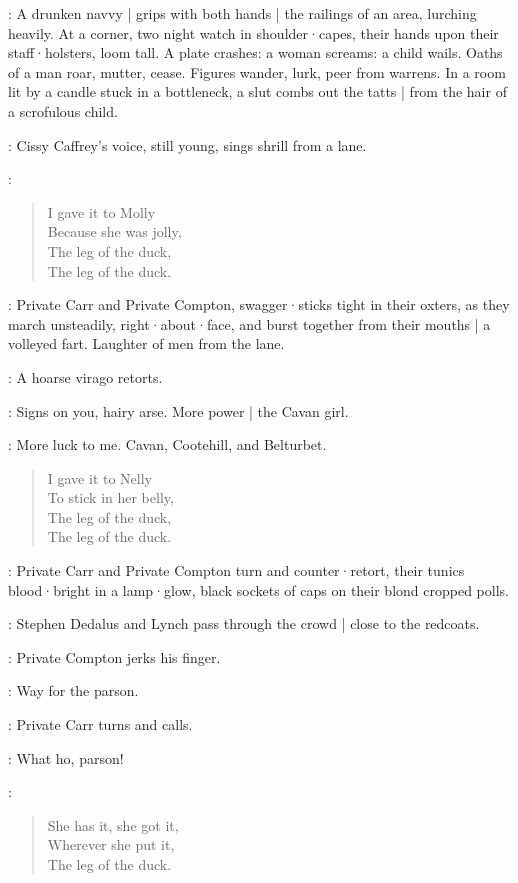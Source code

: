 :
A drunken navvy |
grips with both hands |
the railings of an area,
lurching heavily.
At a corner,
two night watch in shoulder·capes,
their hands upon their staff·holsters,
loom tall.
A plate crashes:
a woman screams:
a child wails.
Oaths of a man roar,
mutter,
cease.
Figures wander,
lurk,
peer from warrens.
In a room lit by a candle stuck in a bottleneck,
a slut combs out the tatts |
from the hair of a scrofulous child.

:
Cissy Caffrey's voice,
still young,
sings shrill from a lane.

\Cissy:
\begin{verse}
    I gave it to Molly\\
    Because she was jolly,\\
    The leg of the duck,\\
    The leg of the duck.
\end{verse}

:
Private Carr and Private Compton,
swagger·sticks tight in their oxters,
as they march unsteadily,
right·about·face,
and burst together from their mouths |
a volleyed fart.
Laughter of men from the lane.

:
A hoarse virago retorts.

\Virago:
Signs on you,
hairy arse.
More power |
the Cavan girl.

\Cissy:
More luck to me.
Cavan,
Cootehill,
and Belturbet.

\begin{verse}
    I gave it to Nelly\\
    To stick in her belly,\\
    The leg of the duck,\\
    The leg of the duck.
\end{verse}

:
Private Carr and Private Compton turn and counter·retort,
their tunics blood·bright in a lamp·glow,
black sockets of caps on their blond cropped polls.

:
Stephen Dedalus and Lynch pass through the crowd |
close to the redcoats.

:
Private Compton jerks his finger.

\Compton:
Way for the parson.

:
Private Carr turns and calls.

\Carr:
What ho,
parson!

\Cissy:

\begin{verse}
%
    She has it, she got it,\\
    Wherever she put it,\\
    The leg of the duck.
\end{verse}

